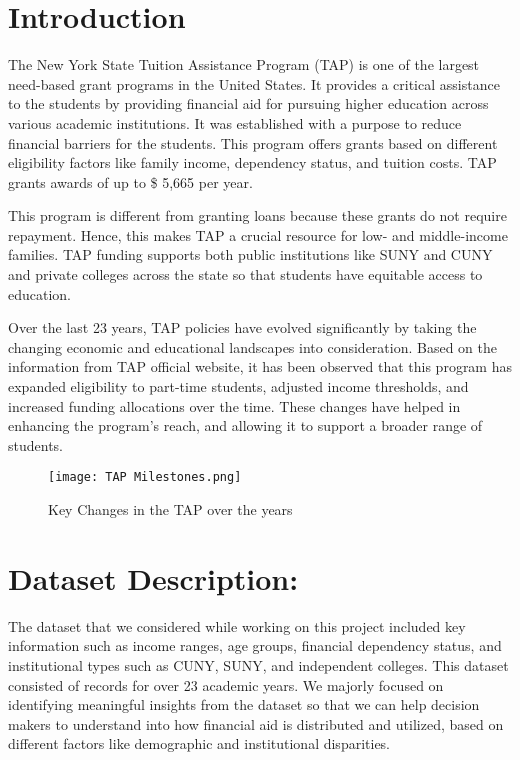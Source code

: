 \documentclass[sigconf]{acmart}
\begin{document}
\maketitle

\section{Introduction}
The New York State Tuition Assistance Program (TAP) is one of the largest need-based grant programs in the United States. It provides a critical assistance to the students by providing financial aid for pursuing higher education across various academic institutions. It was established with a purpose to reduce financial barriers for the students. This program offers grants based on different eligibility factors like family income, dependency status, and tuition costs. TAP grants awards of up to \$ 5,665 per year. 

This program is different from granting loans because these grants do not require repayment. Hence, this makes TAP a crucial resource for low- and middle-income families. TAP funding supports both public institutions like SUNY and CUNY and private colleges across the state so that students have equitable access to education.

Over the last 23 years, TAP policies have evolved significantly by taking the changing economic and educational landscapes into consideration. Based on the information from TAP official website, it has been observed that this program has expanded eligibility to part-time students, adjusted income thresholds, and increased funding allocations over the time. These changes have helped in enhancing the program's reach, and allowing it to support a broader range of students. 

\begin{figure}[h] 
    \centering
    \texttt{[image: TAP Milestones.png]} 
    \caption{Key Changes in the TAP over the years}
    \label{fig:data_collection} 
\end{figure}

\section{Dataset Description: }
The dataset that we considered while working on this project included key information such as income ranges, age groups, financial dependency status, and institutional types such as  CUNY, SUNY, and independent colleges. This dataset consisted of records for over 23 academic years. We majorly focused on identifying meaningful insights from the dataset so that we can help decision makers to understand into how financial aid is distributed and utilized, based on different factors like demographic and institutional disparities.
\end{document}
